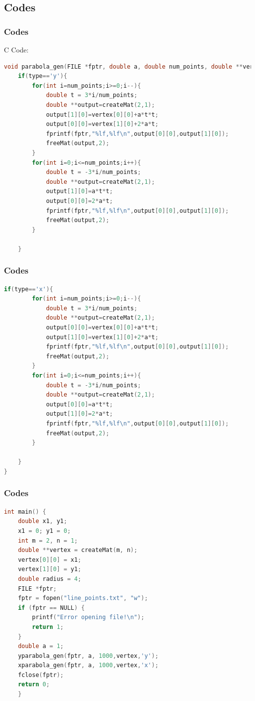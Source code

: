 \documentclass{beamer}
\theoremstyle{remark}
\numberwithin{equation}{section}
\begin{document}
		\subsection{Codes}
		\begin{frame}[fragile]
			\frametitle{Codes}
			C Code:
			\begin{lstlisting}[language=C, basicstyle=\scriptsize]
void parabola_gen(FILE *fptr, double a, double num_points, double **vertex, char type){
    if(type=='y'){
        for(int i=num_points;i>=0;i--){
            double t = 3*i/num_points;
            double **output=createMat(2,1);
            output[1][0]=vertex[0][0]+a*t*t;
            output[0][0]=vertex[1][0]+2*a*t;
            fprintf(fptr,"%lf,%lf\n",output[0][0],output[1][0]);
            freeMat(output,2);
        }
        for(int i=0;i<=num_points;i++){
            double t = -3*i/num_points;
            double **output=createMat(2,1);
            output[1][0]=a*t*t;
            output[0][0]=2*a*t;
            fprintf(fptr,"%lf,%lf\n",output[0][0],output[1][0]);
            freeMat(output,2);
        }

    }

			\end{lstlisting}
		\end{frame}
		\begin{frame}[fragile]
			\frametitle{Codes}
			\begin{lstlisting}[language=C, basicstyle=\scriptsize]
    if(type=='x'){
        for(int i=num_points;i>=0;i--){
            double t = 3*i/num_points;
            double **output=createMat(2,1);
            output[0][0]=vertex[0][0]+a*t*t;
            output[1][0]=vertex[1][0]+2*a*t;
            fprintf(fptr,"%lf,%lf\n",output[0][0],output[1][0]);
            freeMat(output,2);
        }
        for(int i=0;i<=num_points;i++){
            double t = -3*i/num_points;
            double **output=createMat(2,1);
            output[0][0]=a*t*t;
            output[1][0]=2*a*t;
            fprintf(fptr,"%lf,%lf\n",output[0][0],output[1][0]);
            freeMat(output,2);
        }

    }
}
			\end{lstlisting}
		\end{frame}
		\begin{frame}[fragile]
			\frametitle{Codes}
			\begin{lstlisting}[language=C, basicstyle=\scriptsize]
int main() {
	double x1, y1;
	x1 = 0; y1 = 0;
	int m = 2, n = 1;
	double **vertex = createMat(m, n);
	vertex[0][0] = x1;
	vertex[1][0] = y1;
	double radius = 4;
	FILE *fptr;
	fptr = fopen("line_points.txt", "w");
	if (fptr == NULL) {
		printf("Error opening file!\n");
		return 1;
	}
	double a = 1;
	yparabola_gen(fptr, a, 1000,vertex,'y');
	xparabola_gen(fptr, a, 1000,vertex,'x');
	fclose(fptr);
	return 0;
	}
			\end{lstlisting}
		\end{frame}
\end{document}

